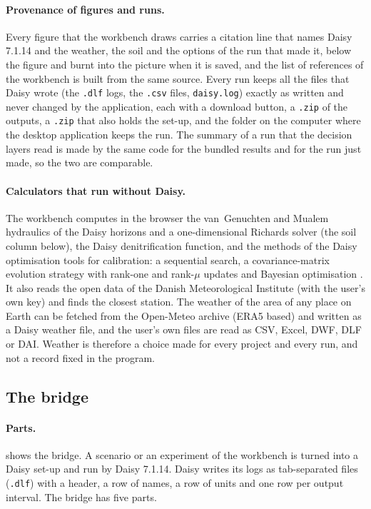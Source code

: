 \paragraph{Provenance of figures and runs.}
Every figure that the workbench draws carries a citation line that names Daisy 7.1.14 \citep{Hansen2012,Holbak2026} and the weather, the soil and the options of the run that made it, below the figure and burnt into the picture when it is saved, and the list of references of the workbench is built from the same source. Every run keeps all the files that Daisy wrote (the \texttt{.dlf} logs, the \texttt{.csv} files, \texttt{daisy.log}) exactly as written and never changed by the application, each with a download button, a \texttt{.zip} of the outputs, a \texttt{.zip} that also holds the set-up, and the folder on the computer where the desktop application keeps the run. The summary of a run that the decision layers read is made by the same code for the bundled results and for the run just made, so the two are comparable.

\paragraph{Calculators that run without Daisy.}
The workbench computes in the browser the van~Genuchten and Mualem hydraulics of the Daisy horizons and a one-dimensional Richards solver (the soil column below), the Daisy denitrification function, and the methods of the Daisy optimisation tools for calibration: a sequential search, a covariance-matrix evolution strategy with rank-one and rank-$\mu$ updates \citep{HansenOstermeier2001} and Bayesian optimisation \citep{Mockus1978}. It also reads the open data of the Danish Meteorological Institute (with the user's own key) and finds the closest station. The weather of the area of any place on Earth can be fetched from the Open-Meteo archive (ERA5 based) and written as a Daisy weather file, and the user's own files are read as CSV, Excel, DWF, DLF or DAI. Weather is therefore a choice made for every project and every run, and not a record fixed in the program.


\subsection{The bridge}
\paragraph{Parts.}
 shows the bridge. A scenario or an experiment of the workbench is turned into a Daisy set-up and run by Daisy 7.1.14. Daisy writes its logs as tab-separated files (\texttt{.dlf}) with a header, a row of names, a row of units and one row per output interval. The bridge has five parts.


